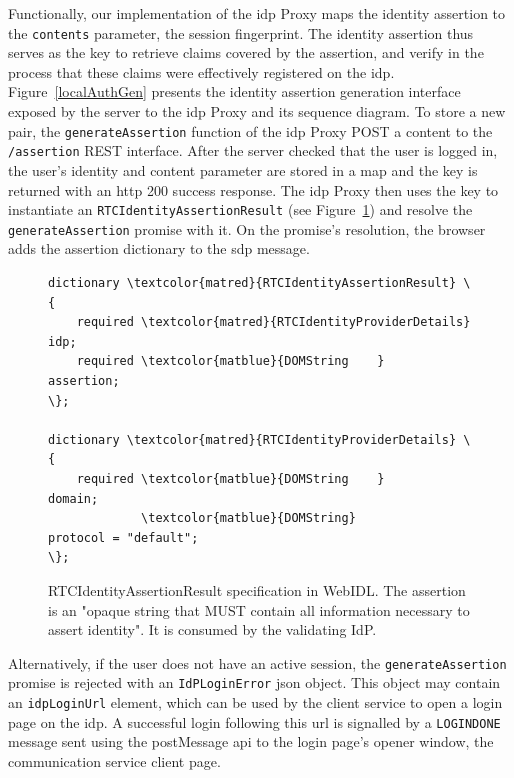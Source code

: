 Functionally, our implementation of the \gls{idp} Proxy maps the identity assertion to the \texttt{contents} parameter, \ie the session fingerprint.
The identity assertion thus serves as the key to retrieve claims covered by the assertion, and verify in the process that these claims were effectively registered on the \gls{idp}.
Figure~\ref{localAuthGen} presents the identity assertion generation interface exposed by the server to the \gls{idp} Proxy and its sequence diagram.
To store a new pair, the \texttt{generateAssertion} function of the \gls{idp} Proxy POST a content to the \texttt{/assertion} REST interface. 
After the server checked that the user is logged in, the user's identity and content parameter are stored in a map and the key is returned with an \gls{http} 200 success response.
The \gls{idp} Proxy then uses the key to instantiate an \texttt{RTCIdentityAssertionResult} (see Figure~\ref{idAssertWebIDL}) and resolve the \texttt{generateAssertion} promise with it.
On the promise's resolution, the browser adds the assertion dictionary to the \gls{sdp} message.

\begin{figure}[H]
\begin{Verbatim}[commandchars=\\\{\}]
dictionary \textcolor{matred}{RTCIdentityAssertionResult} \{
    required \textcolor{matred}{RTCIdentityProviderDetails}       idp;
    required \textcolor{matblue}{DOMString    }        assertion;
\};

dictionary \textcolor{matred}{RTCIdentityProviderDetails} \{
    required \textcolor{matblue}{DOMString    }                domain;
             \textcolor{matblue}{DOMString}                        protocol = "default";
\};

\end{Verbatim}
\caption[RTCIdentityAssertionResult specification in WebIDL]{RTCIdentityAssertionResult specification in WebIDL. The assertion is an "opaque string that MUST contain all information necessary to assert identity". It is consumed by the validating IdP.}
\label{idAssertWebIDL}
\end{figure}

Alternatively, if the user does not have an active session, the \texttt{generateAssertion} promise is rejected with an \texttt{IdPLoginError} \gls{json} object.
This object may contain an \texttt{idpLoginUrl} element, which can be used by the client service to open a login page on the \gls{idp}.
A successful login following this \gls{url} is signalled by a \texttt{LOGINDONE} message sent using the postMessage \gls{api} to the login page's opener window, \ie the communication service client page.

